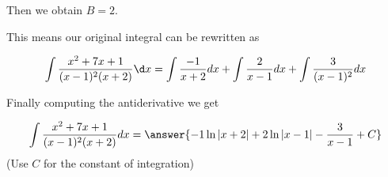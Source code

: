 \documentclass{ximera}
\begin{document}
\begin{exercise}
\begin{exercise}
Then we obtain $B=2$. 

\begin{exercise}
This means our original integral can be rewritten as 

\[
\int \frac{x^{2}+7x+1}{(x-1)^{2}(x+2)} \d x= \int \frac{-1}{x+2} dx + \int \frac{2}{x-1} dx + \int \frac{ 3  }{(x-1)^{2}}   dx
\]

 Finally computing the antiderivative we get 

\[
\int \frac{x^{2}+7x+1}{(x-1)^{2}(x+2)} dx= \answer{ -1\ln|x+2|+2\ln|x-1| -\frac{3}{x-1}+ C }
\]
(Use $C$ for the constant of integration)




\end{exercise}
\end{exercise}
\end{exercise}
\end{document}
